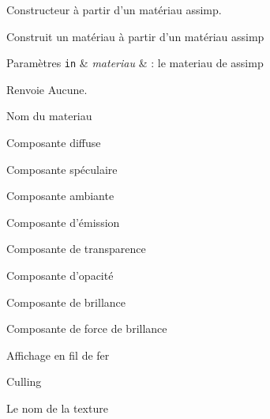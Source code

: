 Constructeur à partir d'un matériau assimp. 

Construit un matériau à partir d'un matériau assimp


\begin{DoxyParams}[1]{Paramètres}
\mbox{\tt in}  & {\em materiau} & \-: le materiau de assimp\\
\hline
\end{DoxyParams}
\begin{DoxyReturn}{Renvoie}
Aucune. 
\end{DoxyReturn}
Nom du materiau

Composante diffuse

Composante spéculaire

Composante ambiante

Composante d'émission

Composante de transparence

Composante d'opacité

Composante de brillance

Composante de force de brillance

Affichage en fil de fer

Culling

Le nom de la texture 